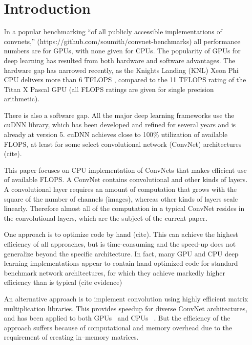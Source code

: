 \section{Introduction}

  In a popular benchmarking ``of all publicly accessible
  implementations of convnets,''
  (https://github.com/soumith/convnet-benchmarks) all performance
  numbers are for GPUs, with none given for CPUs.  The popularity of
  GPUs for deep learning has resulted from both hardware and software
  advantages.  The hardware gap has narrowed recently, as the Knights
  Landing (KNL) Xeon Phi CPU delivers more than 6 TFLOPS \cite{},
  compared to the 11 TFLOPS rating of the Titan X Pascal GPU (all
  FLOPS ratings are given for single precision arithmetic).

  There is also a software gap.  All the major deep learning
  frameworks use the cuDNN library, which has been developed and
  refined for several years and is already at version 5.  cuDNN
  achieves close to 100\% utilization of available FLOPS, at least for
  some select convolutional network (ConvNet) architectures (cite).

  This paper focuses on CPU implementation of ConvNets that makes
  efficient use of available FLOPS.  A ConvNet contains convolutional
  and other kinds of layers.  A convolutional layer requires an amount
  of computation that grows with the square of the number of channels
  (images), whereas other kinds of layers scale linearly.  Therefore
  almost all of the computation in a typical ConvNet resides in the
  convolutional layers, which are the subject of the current paper.
    
  One approach is to optimize code by hand (cite). This can achieve
  the highest efficiency of all approaches, but is time-consuming and
  the speed-up does not generalize beyond the specific architecture.
  In fact, many GPU and CPU deep learning implementations appear to
  contain hand-optimized code for standard benchmark network
  architectures, for which they achieve markedly higher efficiency
  than is typical (cite evidence)

  An alternative approach is to implement convolution using highly
  efficient matrix multiplication libraries.  This provides speedup
  for diverse ConvNet architectures, and has been applied to both
  GPUs~\cite{chetlur2014cudnn} and CPUs ~\cite{hadjis2015shallow}.
  But the efficiency of the approach suffers because of computational
  and memory overhead due to the requirement of creating in--memory
  matrices.

